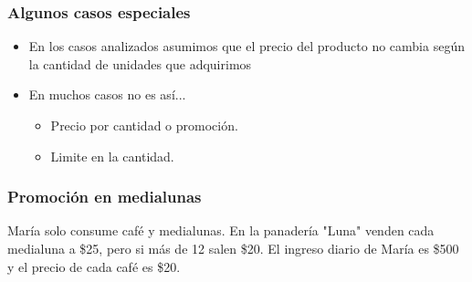 \documentclass{beamer}
\begin{document}
\begin{frame}
\frametitle{Algunos casos especiales}
    \begin{itemize}
    \item En los casos analizados asumimos que el precio del producto no cambia según la cantidad de unidades que adquirimos \vspace{2mm}
    \item En muchos casos no es así...
    \vspace{2mm}
    \begin{itemize}
    \item Precio por cantidad o promoción. \vspace{2mm}
    \item Limite en la cantidad.
    \end{itemize}
    \end{itemize}
\end{frame}

\begin{frame}
\frametitle{Promoción en medialunas}
María solo consume café y medialunas. En la panadería "Luna" venden cada medialuna a \$25, pero si más de 12 salen \$20. El ingreso diario de María es \$500 y el precio de cada café es \$20. 

\begin{center}
\end{center}
\end{frame}
\end{document}
